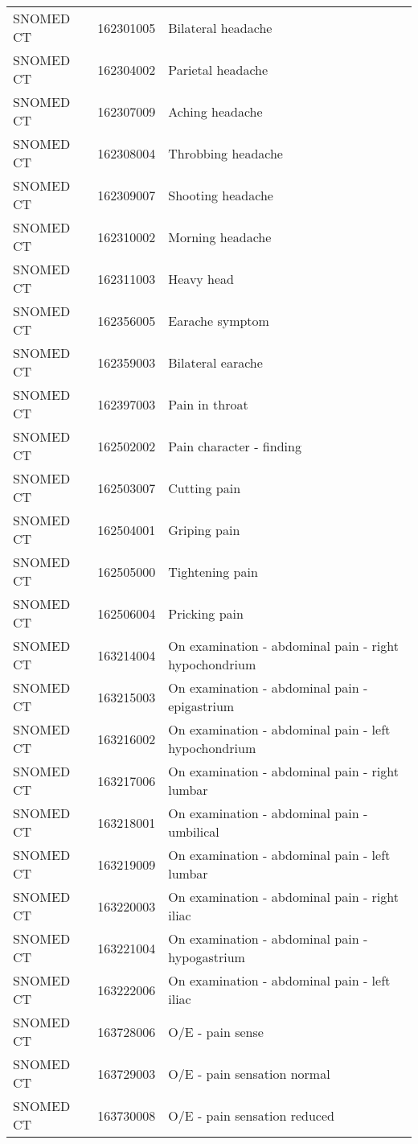 \begin{longtable}{p{}p{}p{}}
  SNOMED CT & 162301005 & Bilateral headache \\ 
  SNOMED CT & 162304002 & Parietal headache \\ 
  SNOMED CT & 162307009 & Aching headache \\ 
  SNOMED CT & 162308004 & Throbbing headache \\ 
  SNOMED CT & 162309007 & Shooting headache \\ 
  SNOMED CT & 162310002 & Morning headache \\ 
  SNOMED CT & 162311003 & Heavy head \\ 
  SNOMED CT & 162356005 & Earache symptom \\ 
  SNOMED CT & 162359003 & Bilateral earache \\ 
  SNOMED CT & 162397003 & Pain in throat \\ 
  SNOMED CT & 162502002 & Pain character - finding \\ 
  SNOMED CT & 162503007 & Cutting pain \\ 
  SNOMED CT & 162504001 & Griping pain \\ 
  SNOMED CT & 162505000 & Tightening pain \\ 
  SNOMED CT & 162506004 & Pricking pain \\ 
  SNOMED CT & 163214004 & On examination - abdominal pain - right hypochondrium \\ 
  SNOMED CT & 163215003 & On examination - abdominal pain - epigastrium \\ 
  SNOMED CT & 163216002 & On examination - abdominal pain - left hypochondrium \\ 
  SNOMED CT & 163217006 & On examination - abdominal pain - right lumbar \\ 
  SNOMED CT & 163218001 & On examination - abdominal pain - umbilical \\ 
  SNOMED CT & 163219009 & On examination - abdominal pain - left lumbar \\ 
  SNOMED CT & 163220003 & On examination - abdominal pain - right iliac \\ 
  SNOMED CT & 163221004 & On examination - abdominal pain - hypogastrium \\ 
  SNOMED CT & 163222006 & On examination - abdominal pain - left iliac \\ 
  SNOMED CT & 163728006 & O/E - pain sense \\ 
  SNOMED CT & 163729003 & O/E - pain sensation normal \\ 
  SNOMED CT & 163730008 & O/E - pain sensation reduced \\ 

\end{longtable}

